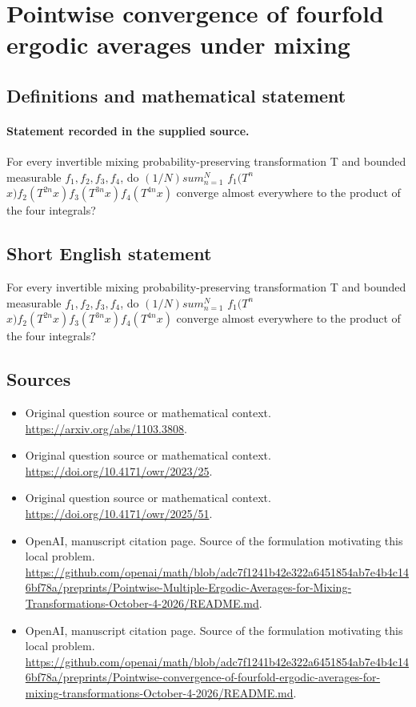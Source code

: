 \documentclass[11pt]{article}
\begin{document}
\section*{Pointwise convergence of fourfold ergodic averages under mixing}\label{30007167}
\subsection{Definitions and mathematical statement}
\paragraph{Statement recorded in the supplied source.}
For every invertible mixing probability-preserving transformation T and bounded measurable $f_1,f_2,f_3,f_4$, do $(1/N)sum_{n=1}^N$ $f_1(T^n$ $x)f_2(T^{2n}x)f_3(T^{3n}x)f_4(T^{4n}x)$ converge almost everywhere to the product of the four integrals?
\subsection{Short English statement}
For every invertible mixing probability-preserving transformation T and bounded measurable $f_1,f_2,f_3,f_4$, do $(1/N)sum_{n=1}^N$ $f_1(T^n$ $x)f_2(T^{2n}x)f_3(T^{3n}x)f_4(T^{4n}x)$ converge almost everywhere to the product of the four integrals?
\subsection{Sources}
\begin{itemize}
\item[S1] Original question source or mathematical context.
\url{https://arxiv.org/abs/1103.3808}.
\item[S2] Original question source or mathematical context.
\url{https://doi.org/10.4171/owr/2023/25}.
\item[S3] Original question source or mathematical context.
\url{https://doi.org/10.4171/owr/2025/51}.
\item[S4] OpenAI, manuscript citation page. Source of the formulation motivating this local problem.
\url{https://github.com/openai/math/blob/adc7f1241b42e322a6451854ab7e4b4c146bf78a/preprints/Pointwise-Multiple-Ergodic-Averages-for-Mixing-Transformations-October-4-2026/README.md}.
\item[S5] OpenAI, manuscript citation page. Source of the formulation motivating this local problem.
\url{https://github.com/openai/math/blob/adc7f1241b42e322a6451854ab7e4b4c146bf78a/preprints/Pointwise-convergence-of-fourfold-ergodic-averages-for-mixing-transformations-October-4-2026/README.md}.
\end{itemize}
\end{document}
